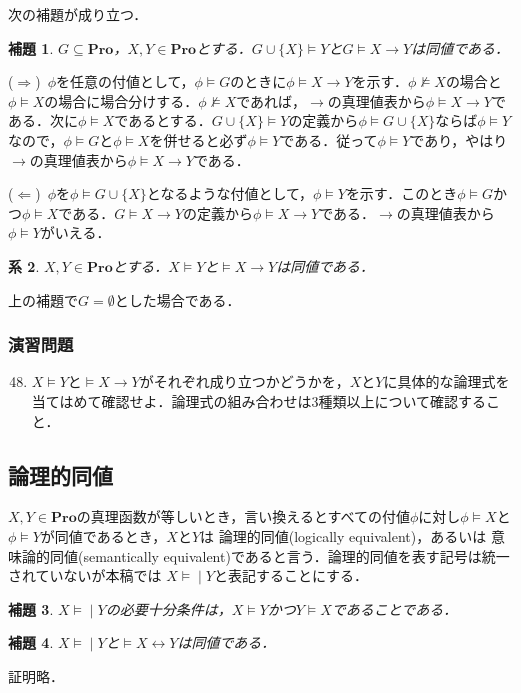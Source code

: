 \documentclass{ltjsarticle}
\makeatletter
\theoremstyle{mystyle1}
\theoremstyle{mystyle3}
\newtheorem{cor}{系}
\newtheorem{lem}[cor]{補題}
\theoremstyle{mystyle2}
\renewenvironment{proof}[1][\proofname]{\par
  \pushQED{\qed}%
  \normalfont
  \topsep6\p@\@plus6\p@ \trivlist
  \item[\hskip\labelsep{\bfseries\sffamily #1}]\ignorespaces
}{%
  \popQED\endtrivlist\@endpefalse
}
\renewcommand\proofname{証明:}
\newcommand{\bPro}{\ensuremath{\mathbf{Pro}}}
\newcommand{\lequiv}{\ensuremath{\models\!\mid}}
\newcommand{\red}[1]{{\color{red} #1}}
\makeatother
\begin{document}
次の補題が成り立つ．
\begin{lem}
  $G\subseteq\bPro$，$X,Y\in\bPro$とする．$G\cup\{X\}\models Y$と$G\models X\to Y$は同値である．
\end{lem}
\begin{proof}
  ($\Rightarrow$)\ $\phi$を任意の付値として，$\phi\models G$のときに$\phi\models X\to Y$を示す．$\phi\not\models X$の場合と$\phi\models X$の場合に場合分けする．$\phi\not\models X$であれば，$\to$の真理値表から$\phi\models X\to Y$である．次に$\phi\models X$であるとする．$G\cup\{X\}\models Y$の定義から$\phi\models G\cup\{X\}$ならば$\phi\models Y$なので，$\phi\models G$と$\phi\models X$を併せると必ず$\phi\models Y$である．従って$\phi\models Y$であり，やはり$\to$の真理値表から$\phi\models X\to Y$である．

  ($\Leftarrow$)\ $\phi$を$\phi\models G\cup\{X\}$となるような付値として，$\phi\models Y$を示す．このとき$\phi\models G$かつ$\phi\models X$である．$G\models X\to Y$の定義から$\phi\models X\to Y$である．$\to$の真理値表から$\phi\models Y$がいえる．
\end{proof}
\begin{cor}
  $X,Y\in\bPro$とする．$X\models Y$と$\models X\to Y$は同値である．
\end{cor}
\begin{proof}
  上の補題で$G = \emptyset$とした場合である．
\end{proof}
\subsubsection*{演習問題}
\begin{enumerate}
  \setcounter{enumi}{47}
  \item $X\models Y$と$\models X\to Y$がそれぞれ成り立つかどうかを，$X$と$Y$に具体的な論理式を当てはめて確認せよ．論理式の組み合わせは3種類以上について確認すること．
\end{enumerate}
\subsection{論理的同値}
$X,Y\in\bPro$の真理函数が等しいとき，言い換えるとすべての付値$\phi$に対し$\phi\models X$と$\phi\models Y$が同値であるとき，$X$と$Y$は\red{論理的同値}(logically equivalent)，あるいは\red{意味論的同値}(semantically equivalent)であると言う．論理的同値を表す記号は統一されていないが本稿では\red{$X\lequiv Y$}と表記することにする．
\begin{lem}
  $X\lequiv Y$の必要十分条件は，$X\models Y$かつ$Y\models X$であることである．
\end{lem}
\begin{lem}
  $X\lequiv Y$と$\models X\leftrightarrow Y$は同値である．
\end{lem}
証明略．
\end{document}
